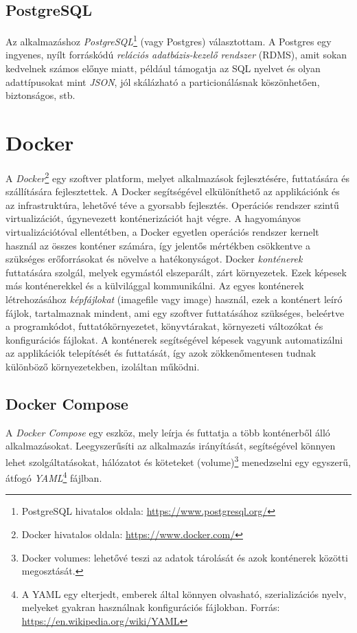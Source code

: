 \documentclass[
]{thesis-ekf}
\theoremstyle{definition}
\theoremstyle{remark}
\begin{document}
\subsection{PostgreSQL}
\label{subsec-postgres}
Az alkalmazáshoz \emph{PostgreSQL}\footnote{PostgreSQL hivatalos oldala: \url{https://www.postgresql.org/}} (vagy Postgres) választottam. A Postgres egy ingyenes, nyílt forráskódú \emph{relációs adatbázis-kezelő rendszer} (RDMS), amit sokan kedvelnek számos előnye miatt, például támogatja az SQL nyelvet és olyan adattípusokat mint \emph{JSON}, jól skálázható a particionálásnak köszönhetően, biztonságos, stb.\cite{postgres-docs}

\section{Docker}
A \emph{Docker}\footnote{Docker hivatalos oldala: \url{https://www.docker.com/}} egy szoftver platform, melyet alkalmazások fejlesztésére, futtatására és szállítására fejlesztettek. A Docker segítségével elkülöníthető az applikációnk és az infrastruktúra, lehetővé téve a gyorsabb fejlesztés.\cite{docker-overview} Operációs rendszer szintű virtualizációt, úgynevezett konténerizációt hajt végre. A hagyományos virtualizációtóval ellentétben, a Docker egyetlen operációs rendszer kernelt használ az összes konténer számára, így jelentős mértékben csökkentve a szükséges erőforrásokat és növelve a hatékonyságot. Docker \emph{konténerek} futtatására szolgál, melyek egymástól elszeparált, zárt környezetek. Ezek képesek más konténerekkel és a külvilággal kommunikálni. Az egyes konténerek létrehozásához \emph{képfájlokat} (imagefile vagy image) használ, ezek a konténert leíró fájlok, tartalmaznak mindent, ami egy szoftver futtatásához szükséges, beleértve a programkódot, futtatókörnyezetet, könyvtárakat, környezeti változókat és konfigurációs fájlokat. A konténerek segítségével képesek vagyunk automatizálni az applikációk telepítését és futtatását, így azok zökkenőmentesen tudnak különböző környezetekben, izoláltan működni.\cite{docker-docs, docker-overview-container, docker-overview-image}

\subsection{Docker Compose}
A \emph{Docker Compose} egy eszköz, mely leírja és futtatja a több konténerből álló alkalmazásokat. Leegyszerűsíti az alkalmazás irányítását, segítségével könnyen lehet szolgáltatásokat, hálózatot és köteteket (volume)\footnote{Docker volumes:  lehetővé teszi az adatok tárolását és azok konténerek közötti megosztását.} menedzselni egy egyszerű, átfogó \emph{YAML}\footnote{A YAML egy elterjedt, emberek által könnyen olvasható, szerializációs nyelv, melyeket gyakran használnak konfigurációs fájlokban. Forrás: \url{https://en.wikipedia.org/wiki/YAML}} fájlban.\cite{docker-compose-docs}
\end{document}
